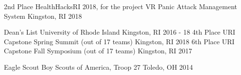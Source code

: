\gradheader
\begin{cvhonors}
  \cvhonor
    {2nd Place}
    {HealthHacksRI 2018, for the project VR Panic Attack Management System}
    {Kingston, RI}
    {2018}
\end{cvhonors}

\ugradheader
\begin{cvhonors}
  \cvhonor
    {Dean's List}
    {University of Rhode Island}
    {Kingston, RI}
    {2016 - 18}
  \cvhonor
    {4th Place}
    {URI Capstone Spring Summit (out of 17 teams)}
    {Kingston, RI}
    {2018}
  \cvhonor
    {6th Place}
    {URI Capstone Fall Symposium (out of 17 teams)}
    {Kingston, RI}
    {2017}
\end{cvhonors}
\otherheader
\begin{cvhonors}
  \cvhonor
  {Eagle Scout}
  {Boy Scouts of America, Troop 27}
  {Toledo, OH}
  {2014}
\end{cvhonors}